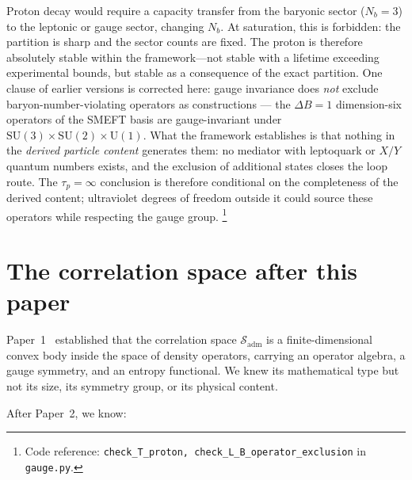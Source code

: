 \documentclass[11pt]{article}
\newcommand{\coderef}[2]{\footnote{Code reference: \texttt{#1} in \texttt{#2}.}}
\newcommand{\SU}{\mathrm{SU}}
\newcommand{\U}{\mathrm{U}}
\begin{document}
Proton decay would require a capacity transfer from the baryonic sector ($N_b = 3$) to the leptonic or gauge sector, changing $N_b$.  At saturation, this is forbidden: the partition is sharp and the sector counts are fixed.  The proton is therefore absolutely stable within the framework---not stable with a lifetime exceeding experimental bounds, but stable as a consequence of the exact partition.  One clause of earlier versions is corrected here: gauge invariance does \emph{not} exclude baryon-number-violating operators as constructions --- the $\Delta B = 1$ dimension-six operators of the SMEFT basis are gauge-invariant under $\SU(3) \times \SU(2) \times \U(1)$.  What the framework establishes is that nothing in the \emph{derived particle content} generates them: no mediator with leptoquark or $X/Y$ quantum numbers exists, and the exclusion of additional states closes the loop route.  The $\tau_p = \infty$ conclusion is therefore conditional on the completeness of the derived content; ultraviolet degrees of freedom outside it could source these operators while respecting the gauge group.
\coderef{check\_T\_proton, check\_L\_B\_operator\_exclusion}{gauge.py}



\section{The correlation space after this paper}
\label{sec:corr_space}

Paper~1~\cite{BrookePaper1} established that the correlation space $\mathcal{S}_{\mathrm{adm}}$ is a finite-dimensional convex body inside the space of density operators, carrying an operator algebra, a gauge symmetry, and an entropy functional.  We knew its mathematical type but not its size, its symmetry group, or its physical content.

After Paper~2, we know:
\end{document}
